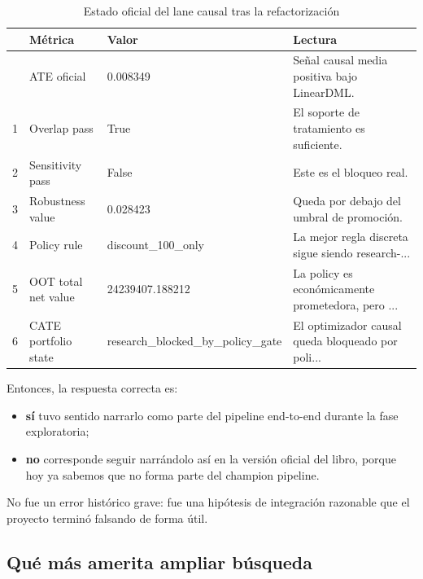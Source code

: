 \documentclass[
  spanish,
  11pt,
  letterpaper,
]{scrbook}
\providecommand{\tightlist}{%
  \setlength{\itemsep}{0pt}\setlength{\parskip}{0pt}}
\theoremstyle{plain}
\theoremstyle{remark}
\begin{document}
{

\begin{longtable}[]{@{}llll@{}}

\caption{\label{tbl-rerun-v2-causal-status}Estado oficial del lane
causal tras la refactorización}

\tabularnewline

\toprule\noalign{}
& Métrica & Valor & Lectura \\
\midrule\noalign{}
\endhead
\bottomrule\noalign{}
\endlastfoot
0 & ATE oficial & 0.008349 & Señal causal media positiva bajo
LinearDML. \\
1 & Overlap pass & True & El soporte de tratamiento es suficiente. \\
2 & Sensitivity pass & False & Este es el bloqueo real. \\
3 & Robustness value & 0.028423 & Queda por debajo del umbral de
promoción. \\
4 & Policy rule & discount\_100\_only & La mejor regla discreta sigue
siendo research-... \\
5 & OOT total net value & 24239407.188212 & La policy es económicamente
prometedora, pero ... \\
6 & CATE portfolio state & research\_blocked\_by\_policy\_gate & El
optimizador causal queda bloqueado por poli... \\

\end{longtable}

}

Entonces, la respuesta correcta es:

\begin{itemize}
\tightlist
\item
  \textbf{sí} tuvo sentido narrarlo como parte del pipeline end-to-end
  durante la fase exploratoria;
\item
  \textbf{no} corresponde seguir narrándolo así en la versión oficial
  del libro, porque hoy ya sabemos que no forma parte del champion
  pipeline.
\end{itemize}

No fue un error histórico grave: fue una hipótesis de integración
razonable que el proyecto terminó falsando de forma útil.

\subsection{Qué más amerita ampliar
búsqueda}\label{quuxe9-muxe1s-amerita-ampliar-buxfasqueda}
\end{document}
